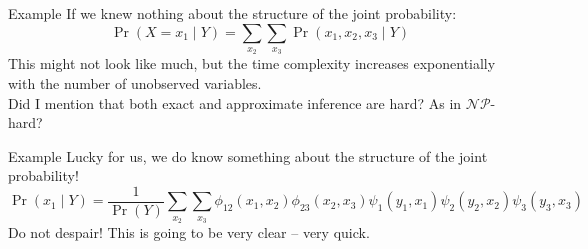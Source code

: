 \documentclass{beamer}
\begin{document}
\begin{frame}{Example}
    \pause
    If we knew nothing about the structure of the joint probability:
    \[ \Pr \left( X = x_{1} \mid Y \right) = \sum_{x_{2}} \sum_{x_{3}} \Pr \left( x_{1}, x_{2}, x_{3} \mid Y \right) \]
    \pause
    This might not look like much, but the time complexity increases exponentially with the number of unobserved variables.\\
    \pause
    Did I mention that both exact and approximate inference are hard? \pause As in $ \mathcal{NP} $-hard?
\end{frame}
\begin{frame}{Example}
    Lucky for us, we do know something about the structure of the joint probability! \pause
    \[
        {\scriptstyle \Pr \left( x_{1} \mid Y \right) = \frac{1}{\Pr \left( Y \right)}
        \sum_{x_{2}} \sum_{x_{3}}
        \phi_{12}\left( x_{1}, x_{2} \right) \phi_{23}\left( x_{2}, x_{3} \right)
        \psi_{1}\left( y_{1}, x_{1} \right) \psi_{2}\left( y_{2}, x_{2} \right) \psi_{3}\left( y_{3}, x_{3} \right)}
    \]
    \pause
    Do not despair! This is going to be very clear -- very quick.
\end{frame}
\end{document}
